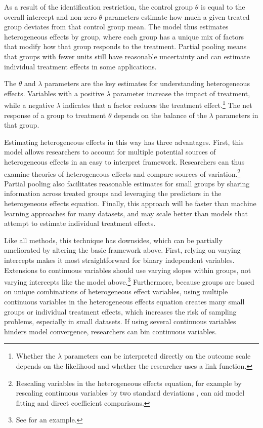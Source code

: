 \documentclass[12pt]{article}
\begin{document}
As a result of the identification restriction, the control group $\theta$ is equal to the overall intercept and non-zero $\theta$ parameters estimate how much a given treated group deviates from that control group mean. 
The model thus estimates heterogeneous effects by group, where each group has a unique mix of factors that modify how that group responds to the treatment. 
Partial pooling means that groups with fewer units still have reasonable uncertainty and can estimate individual treatment effects in some applications. 


The $\theta$ and $\lambda$ parameters are the key estimates for understanding heterogeneous effects. 
Variables with a positive $\lambda$ parameter increase the impact of treatment, while a negative $\lambda$ indicates that a factor reduces the treatment effect.\footnote{Whether the $\lambda$ parameters can be interpreted directly on the outcome scale depends on the likelihood and whether the researcher uses a link function.} 
The net response of a group to treatment $\theta$ depends on the balance of the $\lambda$ parameters in that group. 


Estimating heterogeneous effects in this way has three advantages.
First, this model allows researchers to account for multiple potential sources of heterogeneous effects in an easy to interpret framework. 
Researchers can thus examine theories of heterogeneous effects and compare sources of variation.\footnote{Rescaling variables in the heterogeneous effects equation, for example by rescaling continuous variables by two standard deviations \citep{Gelman2008}, can aid model fitting and direct coefficient comparisons.} 
Partial pooling also facilitates reasonable estimates for small groups by sharing information across treated groups and leveraging the predictors in the heterogeneous effects equation. 
Finally, this approach will be faster than machine learning approaches for many datasets, and may scale better than models that attempt to estimate individual treatment effects.


Like all methods, this technique has downsides, which can be partially ameliorated by altering the basic framework above. 
First, relying on varying intercepts makes it most straightforward for binary independent variables. 
Extensions to continuous variables should use varying slopes within groups, not varying intercepts like the model above.\footnote{See \citet{Alley2021isq} for an example.}
Furthermore, because groups are based on unique combinations of heterogeneous effect variables, using multiple continuous variables in the heterogeneous effects equation creates many small groups or individual treatment effects, which increases the risk of sampling problems, especially in small datasets. 
If using several continuous variables hinders model convergence, researchers can bin continuous variables.
\end{document}
